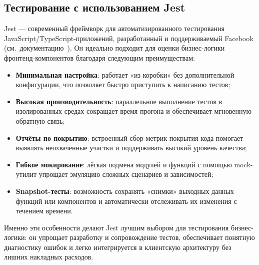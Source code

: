 \subsection{Тестирование с использованием Jest}

Jest — современный фреймворк для автоматизированного тестирования JavaScript/TypeScript-приложений, разработанный и поддерживаемый Facebook (см.~документацию~\cite{jest_docs}). Он идеально подходит для оценки бизнес-логики фронтенд-компонентов благодаря следующим преимуществам:
\begin{itemize}
  \item \textbf{Минимальная настройка}: работает «из коробки» без дополнительной конфигурации, что позволяет быстро приступить к написанию тестов;
  \item \textbf{Высокая производительность}: параллельное выполнение тестов в изолированных средах сокращает время прогона и обеспечивает мгновенную обратную связь;
  \item \textbf{Отчёты по покрытию}: встроенный сбор метрик покрытия кода помогает выявлять неохваченные участки и поддерживать высокий уровень качества;
  \item \textbf{Гибкое мокирование}: лёгкая подмена модулей и функций с помощью mock-утилит упрощает эмуляцию сложных сценариев и зависимостей;
  \item \textbf{Snapshot-тесты}: возможность сохранять «снимки» выходных данных функций или компонентов и автоматически отслеживать их изменения с течением времени.
\end{itemize}

Именно эти особенности делают Jest лучшим выбором для тестирования бизнес-логики: он упрощает разработку и сопровождение тестов, обеспечивает понятную диагностику ошибок и легко интегрируется в клиентскую архитектуру без лишних накладных расходов.
